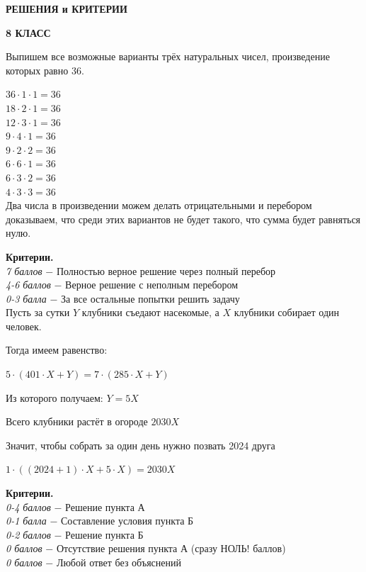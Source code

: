\centerline{\bf \Large  РЕШЕНИЯ и КРИТЕРИИ}

\centerline{\bf \Large  8 КЛАСС}


 Выпишем все возможные варианты трёх натуральных чисел, произведение которых равно 36.

$36\cdot1\cdot1=36$\\
$18\cdot2\cdot1=36$\\
$12\cdot3\cdot1=36$\\
$9\cdot4\cdot1=36$\\
$9\cdot2\cdot2=36$\\
$6\cdot6\cdot1=36$\\
$6\cdot3\cdot2=36$\\
$4\cdot3\cdot3=36$\\

Два числа в произведении можем делать отрицательными и перебором доказываем, что среди этих вариантов не будет такого, что сумма будет равняться нулю.

\par

\textbf{Критерии.} \\
\textit{7 баллов} $-$ Полностью верное решение через полный перебор\\
\textit{4-6 баллов} $-$ Верное решение с неполным перебором\\
\textit{0-3 балла} $-$  За все остальные попытки решить задачу\\


 Пусть за сутки $Y$ клубники съедают насекомые, а $X$ клубники собирает один человек.

Тогда имеем равенство:

$5\cdot(401\cdot X+Y) = 7\cdot(285\cdot X+Y)$

Из которого получаем: $Y=5X$

Всего клубники растёт в огороде $2030X$

Значит, чтобы собрать за один день нужно позвать 2024 друга

$1\cdot((2024+1)\cdot X+5\cdot X) = 2030X$
\par

\textbf{Критерии.} \\
\textit{0-4 баллов} $-$ Решение пункта А\\
\textit{0-1 балла} $-$ Составление условия пункта Б \\
\textit{0-2 баллов} $-$ Решение пункта Б\\
\textit{0 баллов} $-$ Отсутствие решения пункта А (сразу НОЛЬ! баллов)\\
\textit{0 баллов} $-$ Любой ответ без объяснений\\

